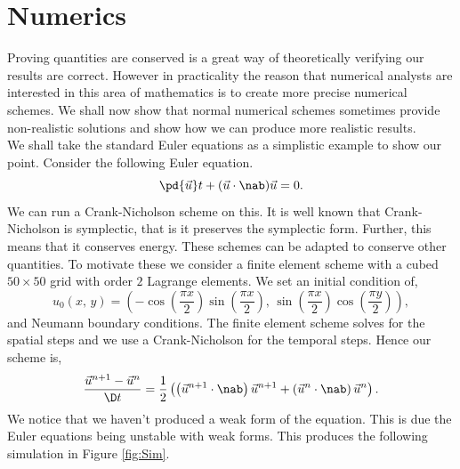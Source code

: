 
\section{Numerics}
Proving quantities are conserved is a great way of theoretically verifying our results are correct. However in practicality the reason that numerical analysts are interested in this area of mathematics is to create more precise numerical schemes. We shall now show that normal numerical schemes sometimes provide non-realistic solutions and show how we can produce more realistic results.\\

\noindent
We shall take the standard Euler equations as a simplistic example to show our point. Consider the following Euler equation.
$$ \pd {\vec u} t + ({\vec u} \cdot\nab){\vec u} = 0. $$
We can run a Crank-Nicholson scheme on this. It is well known that Crank-Nicholson is symplectic, that is it preserves the symplectic form. Further, this means that it conserves energy. These schemes can be adapted to conserve other quantities. To motivate these we consider a finite element scheme with a cubed $50\times 50$ grid with order $2$ Lagrange elements. We set an initial condition of,
$$ u_0(x,\, y) = \left( -\cos \left( \frac{\pi x}{2} \right)\sin \left( \frac{\pi x}{2} \right),\, \sin\left( \frac{\pi x}{2} \right)\cos \left( \frac{\pi y}{2} \right) \right), $$
and Neumann boundary conditions. The finite element scheme solves for the spatial steps and we use a Crank-Nicholson for the temporal steps. Hence our scheme is,
$$ \frac{{\vec u}^{n+1} - {\vec u}^n}{\D t} = \frac{1}{2}\left( \left({\vec u}^{n+1} \cdot \nab\right){\vec u}^{n+1} + \left({\vec u}^{n} \cdot \nab\right){\vec u}^{n}\right). $$
We notice that we haven't produced a weak form of the equation. This is due the Euler equations being unstable with weak forms.
This produces the following simulation in Figure \ref{fig:Sim}.

